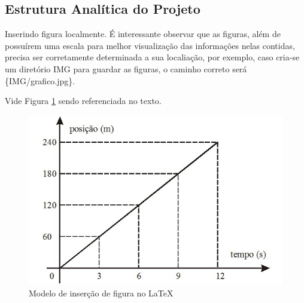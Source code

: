 \documentclass[journal]{IEEEtran}									%
\begin{document}


\subsection{Estrutura Analítica do Projeto}
Inserindo figura localmente. É interessante observar que as figuras, além de possuírem uma escala para melhor visualização das informações nelas contidas, precisa ser corretamente determinada a sua localiação, por exemplo, caso cria-se um diretório IMG para guardar as figuras, o caminho correto será \{IMG/grafico.jpg\}.

Vide Figura \ref{f:grafico} sendo referenciada no texto.

\begin{figure}[h]
	\centering
	\includegraphics[scale=0.4]{grafico.jpg}
	\caption{Modelo de inserção de figura no LaTeX}
	\label{f:grafico}
\end{figure}
\end{document}
